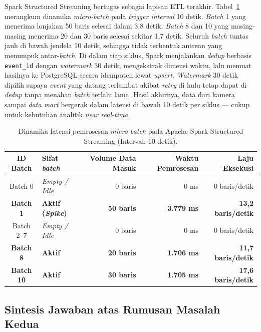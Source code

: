 Spark Structured Streaming bertugas sebagai lapisan ETL terakhir. Tabel~\ref{tab:spark-microbatch} merangkum dinamika \textit{micro-batch} pada \textit{trigger interval} 10 detik. \textit{Batch} 1 yang menerima lonjakan 50 baris selesai dalam 3,8 detik; \textit{Batch} 8 dan 10 yang masing-masing menerima 20 dan 30 baris selesai sekitar 1,7 detik. Seluruh \textit{batch} tuntas jauh di bawah jendela 10 detik, sehingga tidak terbentuk antrean yang menumpuk antar-\textit{batch}. Di dalam tiap siklus, Spark menjalankan \textit{dedup} berbasis \texttt{event\_id} dengan \textit{watermark} 30 detik, mengekstrak dimensi waktu, lalu memuat hasilnya ke PostgreSQL secara idempoten lewat \textit{upsert}. \textit{Watermark} 30 detik dipilih supaya \textit{event} yang datang terlambat akibat \textit{retry} di hulu tetap dapat di-\textit{dedup} tanpa menahan \textit{batch} terlalu lama. Hasil akhirnya, data dari kamera sampai \textit{data mart} bergerak dalam latensi di bawah 10 detik per siklus --- cukup untuk kebutuhan analitik \textit{near real-time} \cite{zaharia2018structured}.

\begin{table}[htbp]
\centering
\caption{Dinamika latensi pemrosesan \textit{micro-batch} pada Apache Spark Structured Streaming (Interval: 10 detik).}
\label{tab:spark-microbatch}
\small
\setlength{\tabcolsep}{4pt}
\begin{tabularx}{\textwidth}{c>{\RaggedRight\arraybackslash}Xrrr}
\toprule
\textbf{ID Batch} & \textbf{Sifat \textit{batch}} & \textbf{Volume Data Masuk} & \textbf{Waktu Pemrosesan} & \textbf{Laju Eksekusi} \\
\midrule
Batch 0 & \textit{Empty / Idle} & 0 baris & 0 ms & 0 baris/detik \\
\textbf{Batch 1} & \textbf{Aktif (\textit{Spike})} & \textbf{50 baris} & \textbf{3.779 ms} & \textbf{13,2 baris/detik} \\
Batch 2--7 & \textit{Empty / Idle} & 0 baris & 0 ms & 0 baris/detik \\
\textbf{Batch 8} & \textbf{Aktif} & \textbf{20 baris} & \textbf{1.706 ms} & \textbf{11,7 baris/detik} \\
\textbf{Batch 10} & \textbf{Aktif} & \textbf{30 baris} & \textbf{1.705 ms} & \textbf{17,6 baris/detik} \\
\bottomrule
\end{tabularx}
\end{table}

\subsection{Sintesis Jawaban atas Rumusan Masalah Kedua}
\label{subsec:sintesis-rm2}

